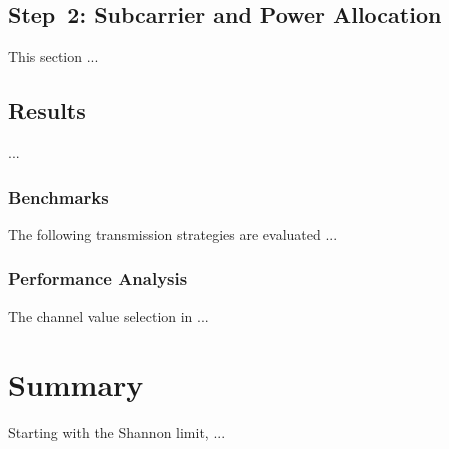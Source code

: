 \subsection{Step~2: Subcarrier and Power Allocation}
\label{step2}
This section ...

\subsection{Results}
\label{results}

...


\subsubsection{Benchmarks}
The following transmission strategies are evaluated ...

\subsubsection{Performance Analysis}
The channel value selection in ...

\section{Summary}
\label{ch4:summary}
Starting with the Shannon limit, ...
